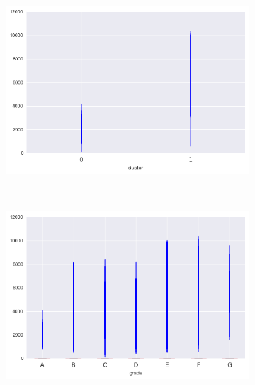 \begin{apendicesenv}
\begin{figure}[t!]
\begin{subfigure}[t]{0.5\textwidth}
			\centerline{\includegraphics[width=1.05\textwidth]{img/out_prncp_inv_by_cluster}}
    	\end{subfigure}%
    	~ 
    	\begin{subfigure}[t]{0.5\textwidth}
    		\centering
   
			\centerline{\includegraphics[width=1.05\textwidth]{img/out_prncp_inv_by_grade}}

    	\end{subfigure}
\\
    	        \caption{total\textunderscore rec\textunderscore int }
    	\begin{subfigure}[t]{0.5\textwidth}
    		\centering


\end{subfigure}
\end{figure}
\end{apendicesenv}

